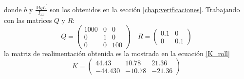 \documentclass[main]{subfiles}
\begin{document}
donde $b$ y $\frac{MgL^\prime}{I_{xx}}$ son los obtenidos en la secci\'on \ref{chap:verificaciones}. Trabajando con las matrices $Q$ y $R$:\\
\begin{equation}
\label{eq:Q_R_roll}
Q = \left(\begin{array}{ccc}
1000 & 0 & 0\\
0 & 1 & 0\\
0 & 0 & 100 
\end{array} \right) \quad R =\left(\begin{array}{cc}
0.1 & 0 \\
0 & 0.1
\end{array}\right)
\end{equation}
la matriz de realimentaci\'on obtenida es la mostrada en la ecuación \ref{K_roll}
\begin{equation}
\label{K_roll}
K = \left( \begin{array}{ccc}
44.43 & 10.78 &21.36\\
-44.430 & -10.78 &-21.36
\end{array}\right)
\end{equation}
\end{document}
